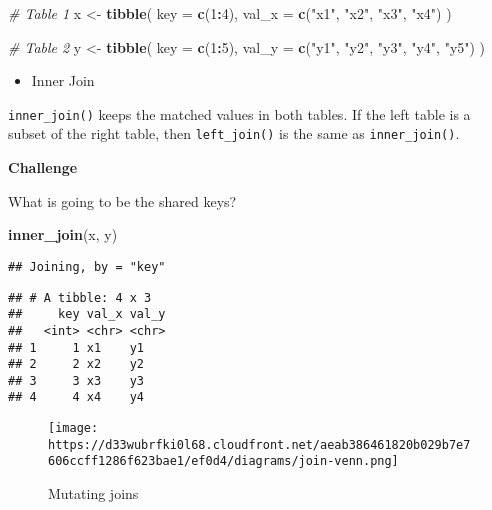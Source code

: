 \documentclass[
]{book}
\newenvironment{Shaded}{\begin{snugshade}}{\end{snugshade}}
\newcommand{\CommentTok}[1]{\textcolor[rgb]{0.56,0.35,0.01}{\textit{#1}}}
\newcommand{\DataTypeTok}[1]{\textcolor[rgb]{0.13,0.29,0.53}{#1}}
\newcommand{\DecValTok}[1]{\textcolor[rgb]{0.00,0.00,0.81}{#1}}
\newcommand{\KeywordTok}[1]{\textcolor[rgb]{0.13,0.29,0.53}{\textbf{#1}}}
\newcommand{\NormalTok}[1]{#1}
\newcommand{\OperatorTok}[1]{\textcolor[rgb]{0.81,0.36,0.00}{\textbf{#1}}}
\newcommand{\StringTok}[1]{\textcolor[rgb]{0.31,0.60,0.02}{#1}}
\providecommand{\tightlist}{%
  \setlength{\itemsep}{0pt}\setlength{\parskip}{0pt}}
\begin{document}
\begin{Shaded}
\begin{Highlighting}[]
\CommentTok{\# Table 1}
\NormalTok{x \textless{}{-}}\StringTok{ }\KeywordTok{tibble}\NormalTok{(}
  \DataTypeTok{key =} \KeywordTok{c}\NormalTok{(}\DecValTok{1}\OperatorTok{:}\DecValTok{4}\NormalTok{),}
  \DataTypeTok{val\_x =} \KeywordTok{c}\NormalTok{(}\StringTok{"x1"}\NormalTok{, }\StringTok{"x2"}\NormalTok{, }\StringTok{"x3"}\NormalTok{, }\StringTok{"x4"}\NormalTok{)}
\NormalTok{)}

\CommentTok{\# Table 2}
\NormalTok{y \textless{}{-}}\StringTok{ }\KeywordTok{tibble}\NormalTok{(}
  \DataTypeTok{key =} \KeywordTok{c}\NormalTok{(}\DecValTok{1}\OperatorTok{:}\DecValTok{5}\NormalTok{),}
  \DataTypeTok{val\_y =} \KeywordTok{c}\NormalTok{(}\StringTok{"y1"}\NormalTok{, }\StringTok{"y2"}\NormalTok{, }\StringTok{"y3"}\NormalTok{, }\StringTok{"y4"}\NormalTok{, }\StringTok{"y5"}\NormalTok{)}
\NormalTok{)}
\end{Highlighting}
\end{Shaded}

\begin{itemize}
\tightlist
\item
  Inner Join
\end{itemize}

\texttt{inner\_join()} keeps the matched values in both tables. If the left table is a subset of the right table, then \texttt{left\_join()} is the same as \texttt{inner\_join()}.

\textbf{Challenge}

What is going to be the shared keys?

\begin{Shaded}
\begin{Highlighting}[]
\KeywordTok{inner\_join}\NormalTok{(x, y)}
\end{Highlighting}
\end{Shaded}

\begin{verbatim}
## Joining, by = "key"
\end{verbatim}

\begin{verbatim}
## # A tibble: 4 x 3
##     key val_x val_y
##   <int> <chr> <chr>
## 1     1 x1    y1   
## 2     2 x2    y2   
## 3     3 x3    y3   
## 4     4 x4    y4
\end{verbatim}

\begin{figure}
\centering
\texttt{[image: https://d33wubrfki0l68.cloudfront.net/aeab386461820b029b7e7606ccff1286f623bae1/ef0d4/diagrams/join-venn.png]}
\caption{Mutating joins}
\end{figure}
\end{document}
